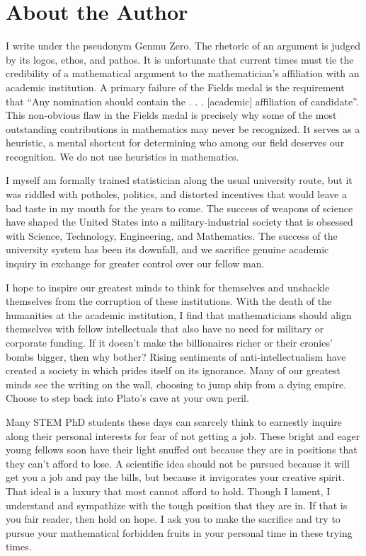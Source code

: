 \documentclass[10pt, a5paper, twoside, openright]{memoir}
\begin{document}
\section{About the Author}

I write under the pseudonym Genmu Zero. The rhetoric of an argument is judged by its logos, ethos, and pathos. It is unfortunate that current times must tie the credibility of a mathematical argument to the mathematician's affiliation with an academic institution. A primary failure of the Fields medal is the requirement that ``Any nomination should contain the . . . [academic] affiliation of candidate''. This non-obvious flaw in the Fields medal is precisely why some of the most outstanding contributions in mathematics may never be recognized. It serves as a heuristic, a mental shortcut for determining who among our field deserves our recognition. We do not use heuristics in mathematics.

I myself am formally trained statistician along the usual university route, but it was riddled with potholes, politics, and distorted incentives that would leave a bad taste in my mouth for the years to come. The success of weapons of science have shaped the United States into a military-industrial society that is obsessed with Science, Technology, Engineering, and Mathematics. The success of the university system has been its downfall, and we sacrifice genuine academic inquiry in exchange for greater control over our fellow man.

I hope to inspire our greatest minds to think for themselves and unshackle themselves from the corruption of these institutions. With the death of the humanities at the academic institution, I find that mathematicians should align themselves with fellow intellectuals that also have no need for military or corporate funding. If it doesn't make the billionaires richer or their cronies' bombs bigger, then why bother? Rising sentiments of anti-intellectualism have created a society in which prides itself on its ignorance. Many of our greatest minds see the writing on the wall, choosing to jump ship from a dying empire. Choose to step back into Plato's cave at your own peril.

Many STEM PhD students these days can scarcely think to earnestly inquire along their personal interests for fear of not getting a job. These bright and eager young fellows soon have their light snuffed out because they are in positions that they can't afford to lose. A scientific idea should not be pursued because it will get you a job and pay the bills, but because it invigorates your creative spirit. That ideal is a luxury that most cannot afford to hold. Though I lament, I understand and sympathize with the tough position that they are in. If that is you fair reader, then hold on hope. I ask you to make the sacrifice and try to pursue your mathematical forbidden fruits in your personal time in these trying times.
\end{document}
